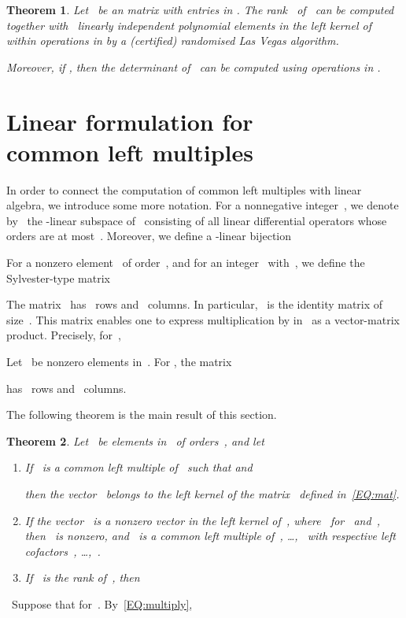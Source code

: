 \documentclass{sig-alt-full}
\def\myproof{\noindent{\sc Proof.}~}
\newtheorem{theorem}{Theorem}
\begin{document}
\begin{theorem}\emph{\cite{Storjohann03,StVi05}} \label{theo:SV}
Let~ be an 
matrix with entries in . 
The rank~ of~ can be computed together with~
linearly independent polynomial elements in the left kernel of~ within
 operations in 
by a (certified) randomised Las Vegas algorithm.

Moreover, if , then the determinant of~ can be computed using  operations in .
\end{theorem}


\section{Linear formulation for \\ common left multiples} \label{SECT:mat}

In order to connect the computation of common left multiples with linear algebra, we introduce some more notation.
For a nonnegative integer~, we denote by~ the -linear
subspace of~ consisting of all linear differential operators whose orders are at most~.
Moreover, we define a -linear bijection

For a nonzero element~ of order~, and for an integer~ with~, we define
the Sylvester-type matrix

The matrix~
has~ rows and~ columns. In particular,~ is the identity
matrix of size~. This matrix enables one to express multiplication by  in~ as a vector-matrix product. Precisely, for~,



Let~ be nonzero elements in~.
For , the  matrix

has~ rows and~ columns.

\smallskip The following theorem is the main result of this section.
\begin{theorem} \label{TH:mat}
Let~ be  elements in~ of  orders~,
and let~
\begin{enumerate}
\item[(i)]
If~ is a common left multiple of~ such that  and 

then the vector~
belongs to the left kernel of the matrix~ defined in~\eqref{EQ:mat}.
\item[(ii)] If the vector~ is a nonzero vector in the left kernel of~,
where~ for~ and~, then~ is nonzero,
and~ is a common
left multiple of~, \ldots,~ with respective left cofactors~,
\ldots,~.
\item[(iii)] If~ is the rank of~, then\\

\end{enumerate}
\end{theorem}
\myproof Suppose that  for~.
By~\eqref{EQ:multiply},
\end{document}
